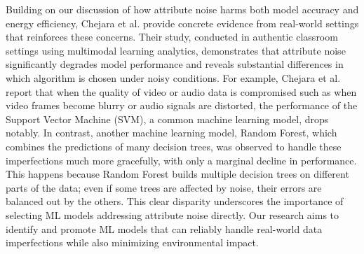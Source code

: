 \documentclass[conference]{IEEEtran}
\begin{document}
\newline
\newline
\newline
Building on our discussion of how attribute noise harms both model accuracy and energy efficiency, Chejara et al. \cite{chejara2024impact} provide concrete evidence from real-world settings that reinforces these concerns. Their study, conducted in authentic classroom settings using multimodal learning analytics, demonstrates that attribute noise significantly degrades model performance and reveals substantial differences in which algorithm is chosen under noisy conditions. For example, Chejara et al. \cite{chejara2024impact} report that when the quality of video or audio data is compromised such as when video frames become blurry or audio signals are distorted, the performance of the Support Vector Machine (SVM), a common machine learning model, drops notably. In contrast, another machine learning model, Random Forest, which combines the predictions of many decision trees, was observed to handle these imperfections much more gracefully, with only a marginal decline in performance. This happens because Random Forest builds multiple decision trees on different parts of the data; even if some trees are affected by noise, their errors are balanced out by the others. This clear disparity underscores the importance of selecting ML models addressing attribute noise directly. Our research aims to identify and promote ML models that can reliably handle real-world data imperfections while also minimizing environmental impact.
\newline
\newline
\end{document}
